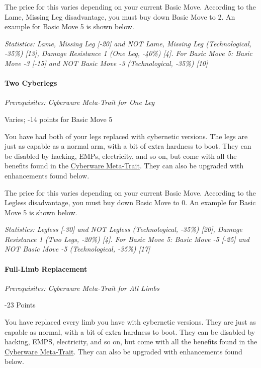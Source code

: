 \begin{multicols*}{3}
	The price for this varies depending on your current Basic Move. According to the Lame, Missing Leg disadvantage, you must buy down Basic Move to 2. An example for Basic Move 5 is shown below.	
	
	\textit{\textcolor{OliveGreen}{Statistics:  Lame, Missing Leg [-20] and NOT Lame, Missing Leg (Technological, -35\%) [13], Damage Resistance 1 (One Leg, -40\%) [4]. For Basic Move 5: Basic Move -3 [-15] and NOT Basic Move -3 (Technological, -35\%) [10]}}
	
	\paragraph{Two Cyberlegs}
	\textit{Prerequisites:  Cyberware Meta-Trait for One Leg}
	\begin{flushright}
		Varies; -14 points for Basic Move 5
	\end{flushright}

	You have had both of your legs replaced with cybernetic versions. The legs are just as capable as a normal arm, with a bit of extra hardness to boot. They can be disabled by hacking, EMPs, electricity, and so on, but come with all the benefits found in the \hyperref[cyberware-meta-trait]{Cyberware Meta-Trait}. They can also be upgraded with enhancements found below.
	
	The price for this varies depending on your current Basic Move. According to the Legless disadvantage, you must buy down Basic Move to 0. An example for Basic Move 5 is shown below.
	
	\textit{\textcolor{OliveGreen}{Statistics:  Legless [-30] and NOT Legless (Technological, -35\%) [20], Damage Resistance 1 (Two Legs, -20\%) [4]. For Basic Move 5: Basic Move -5 [-25] and NOT Basic Move -5 (Technological, -35\%) [17]}}
	
	\paragraph{Full-Limb Replacement}
	\textit{Prerequisites:  Cyberware Meta-Trait for All Limbs}
	\begin{flushright}
		-23 Points
	\end{flushright}
	
	You have replaced every limb you have with cybernetic versions. They are just as capable as normal, with a bit of extra hardness to boot. They can be disabled by hacking, EMPS, electricity, and so on, but come with all the benefits found in the \hyperref[cyberware-meta-trait]{Cyberware Meta-Trait}. They can also be upgraded with enhancements found below.
	

\end{multicols*}
